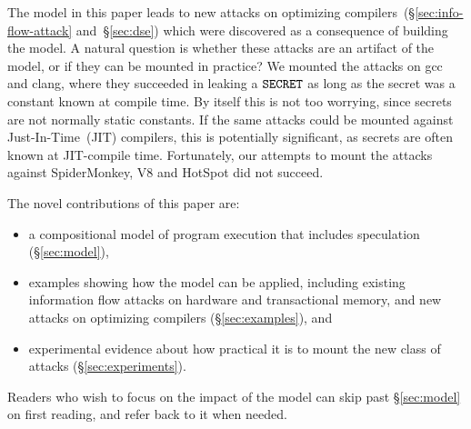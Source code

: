 The model in this paper leads to new attacks on optimizing
compilers~(\S\ref{sec:info-flow-attack} and~\S\ref{sec:dse}) which
were discovered as a consequence of building the model. A natural
question is whether these attacks are an artifact of the model, or if
they can be mounted in practice? We mounted the attacks on gcc and
clang, where they succeeded in leaking a $\texttt{SECRET}$ as long as the secret
was a constant known at compile time. By itself this is not too
worrying, since secrets are not normally static constants. If the same
attacks could be mounted against Just-In-Time~(JIT) compilers, this
is potentially significant, as secrets are often known at JIT-compile
time. Fortunately, our attempts to mount the attacks against SpiderMonkey,
V8 and HotSpot did not succeed.

The novel contributions of this paper are:
\begin{itemize}

\item a compositional model of program execution that includes speculation (\S\ref{sec:model}),

\item examples showing how the model can be applied,
  including existing information flow attacks on
  hardware and transactional memory, and new attacks on optimizing compilers (\S\ref{sec:examples}), and

\item experimental evidence about how practical it is to mount
  the new class of attacks (\S\ref{sec:experiments}).

\end{itemize}
Readers who wish to focus on the impact of the model can skip past \S\ref{sec:model}
on first reading, and refer back to it when needed.
